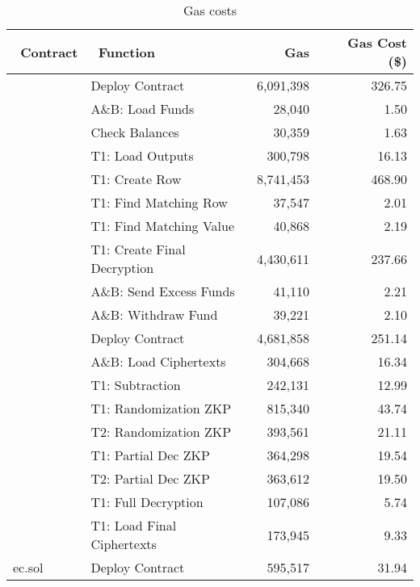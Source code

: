 \begin{table}[t]
		\centering
	\begin{tabular}{|l|l|r|r|}
		\hline
		~\textbf{Contract} & ~\textbf{Function } & ~\textbf{Gas}  & ~\textbf{Gas Cost (\$)}  \\ \hline
		\multirow{9}{*}{}  
		& Deploy Contract &6,091,398 & 326.75 \\ \cline{2-4} 
		& A\&B: Load Funds & 28,040  &1.50  \\ \cline{2-4} 
		& Check Balances &  30,359& 1.63 \\  \cline{2-4} 
		& T1: Load Outputs&  300,798 & 16.13 \\  \cline{2-4} 
		& T1: Create Row & 8,741,453 & 468.90 \\  \cline{2-4}
		Mixmatch.sol	& T1: Find Matching Row & 37,547 &2.01  \\  \cline{2-4}
		& T1: Find Matching Value &  40,868&2.19 \\  \cline{2-4}
		& T1:  Create Final Decryption&  4,430,611& 237.66 \\  \cline{2-4}
		& A\&B: Send Excess Funds &  41,110& 2.21 \\  \cline{2-4}
		&  A\&B:  Withdraw Fund&  39,221& 2.10 \\   \hline
		\multirow{8}{*}{} 
		& Deploy Contract & 4,681,858&251.14 \\ \cline{2-4} 
		&   A\&B: Load Ciphertexts & 304,668 & 16.34 \\  \cline{2-4}
		& T1: Subtraction & 242,131 & 12.99\\  \cline{2-4}
		& T1: Randomization ZKP& 815,340 &  43.74\\  \cline{2-4}
		PET.sol	&  T2: Randomization ZKP& 393,561 &21.11  \\  \cline{2-4}
		& T1: Partial Dec ZKP& 364,298 & 19.54\\  \cline{2-4}
		& T2: Partial Dec ZKP & 363,612 & 19.50 \\  \cline{2-4}
		& T1: Full Decryption  &  107,086& 5.74 \\  \cline{2-4}
		& T1:  Load Final Ciphertexts& 173,945 & 9.33\\ \cline{1-4} 
	ec.sol	& Deploy Contract &595,517 & 31.94 \\ \hline
	\end{tabular}
	\caption{Gas costs}
	 \label{tab:gascost}
\end{table}